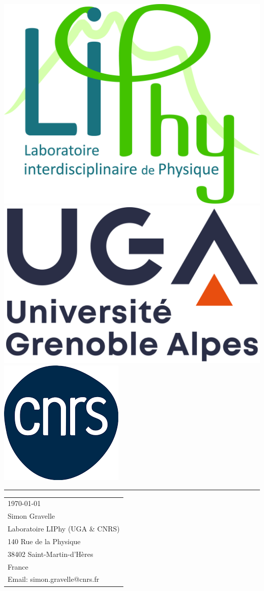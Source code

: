 \documentclass{article}
\begin{document}

\includegraphics[height=0.2\textwidth]{liphy.jpg} %
\hspace{1.55cm}
\includegraphics[height=0.2\textwidth]{uga.png} %
\hspace{1.55cm}
\includegraphics[height=0.2\textwidth]{cnrs.png} %

\vspace{-1em} %

\rule{\linewidth}{1pt} %

\bigskip\bigskip %


\hfill
\begin{tabular}{l @{}}
	\today \bigskip\\ %
	Simon Gravelle \\
    Laboratoire LIPhy (UGA \& CNRS) \\
	140 Rue de la Physique \\
    38402 Saint-Martin-d'Hères \\
    France \\
	Email: simon.gravelle@cnrs.fr
\end{tabular}
\end{document}
